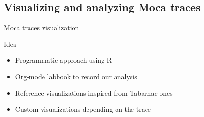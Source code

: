\documentclass[xcolor={usenames,dvipsnames},hyperref={pdfusetitle}]{beamer}
\begin{document}
\subsection*{Visualizing and analyzing Moca traces}

\setcounter{framenumber}{\value{finalframe}}
\begin{frame}{Moca traces visualization}
    \begin{block}{Idea}
        \begin{itemize}
            \item Programmatic approach using R
            \item Org-mode labbook to record our analysis
            \item Reference visualizations inspired from Tabarnac ones
            \item Custom visualizations depending on the trace
        \end{itemize}
    \end{block}
\end{frame}
\end{document}
